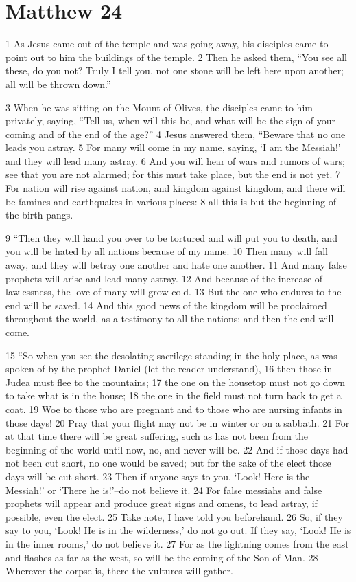 \chapter{Matthew 24}
\label{ch:matt24}

1 As Jesus came out of the temple and was going away, his disciples came to 
point out to him the buildings of the temple. 2 Then he asked them, ``You see 
all these, do you not? Truly I tell you, not one stone will be left here upon 
another; all will be thrown down.''

3 When he was sitting on the Mount of Olives, the disciples came to him 
privately, saying, ``Tell us, when will this be, and what will be the sign of 
your coming and of the end of the age?'' 4 Jesus answered them, ``Beware that 
no one leads you astray. 5 For many will come in my name, saying, `I am the 
Messiah!' and they will lead many astray. 6 And you will hear of wars and 
rumors of wars; see that you are not alarmed; for this must take place, but the 
end is not yet. 7 For nation will rise against nation, and kingdom against 
kingdom, and there will be famines and earthquakes in various places: 8 all 
this is but the beginning of the birth pangs.

9 ``Then they will hand you over to be tortured and will put you to death, and 
you will be hated by all nations because of my name. 10 Then many will fall 
away, and they will betray one another and hate one another. 11 And many false 
prophets will arise and lead many astray. 12 And because of the increase of 
lawlessness, the love of many will grow cold. 13 But the one who endures to the 
end will be saved. 14 And this good news of the kingdom will be proclaimed 
throughout the world, as a testimony to all the nations; and then the end will 
come.

15 ``So when you see the desolating sacrilege standing in the holy place, as 
was spoken of by the prophet Daniel (let the reader understand), 16 then those 
in Judea must flee to the mountains; 17 the one on the housetop must not go 
down to take what is in the house; 18 the one in the field must not turn back 
to get a coat. 19 Woe to those who are pregnant and to those who are nursing 
infants in those days! 20 Pray that your flight may not be in winter or on a 
sabbath. 21 For at that time there will be great suffering, such as has not 
been from the beginning of the world until now, no, and never will be. 22 And 
if those days had not been cut short, no one would be saved; but for the sake 
of the elect those days will be cut short. 23 Then if anyone says to you, `Look! 
Here is the Messiah!' or `There he is!'--do not believe it. 24 For false 
messiahs and false prophets will appear and produce great signs and omens, to 
lead astray, if possible, even the elect. 25 Take note, I have told you 
beforehand. 26 So, if they say to you, `Look! He is in the wilderness,' do not 
go out. If they say, `Look! He is in the inner rooms,' do not believe it. 27 For 
as the lightning comes from the east and flashes as far as the west, so will be 
the coming of the Son of Man. 28 Wherever the corpse is, there the vultures 
will gather.

